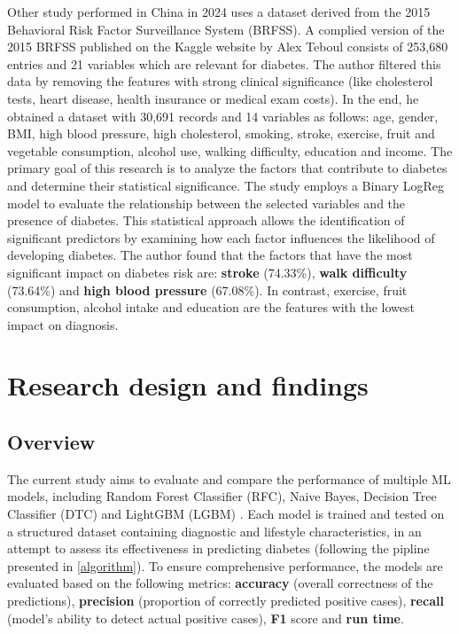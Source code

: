 \documentclass[runningheads]{llncs}
\begin{document}
Other study \cite{Xu2024} performed in China in 2024 uses a dataset derived from the 2015 Behavioral Risk Factor Surveillance System (BRFSS). A complied version of the 2015 BRFSS published on the Kaggle website by Alex Teboul consists of 253,680 entries and 21 variables which are relevant for diabetes. The author filtered this data by removing the features with strong clinical significance (like cholesterol tests, heart disease, health insurance or medical exam costs). In the end, he obtained a dataset with 30,691 records and 14 variables as follows: age, gender, BMI, high blood pressure, high cholesterol, smoking, stroke, exercise, fruit and vegetable consumption, alcohol use, walking difficulty, education and income. 
The primary goal of this research is to analyze the factors that contribute to diabetes and determine their statistical significance. 
The study employs a Binary LogReg model to evaluate the relationship between the selected variables and the presence of diabetes. This statistical approach allows the identification of significant predictors by examining how each factor influences the likelihood of developing diabetes. 
The author found that the factors that have the most significant impact on diabetes risk are: \textbf{stroke} (74.33\%), \textbf{walk difficulty} (73.64\%) and \textbf{high blood pressure} (67.08\%). In contrast, exercise, fruit consumption, alcohol intake and education are the features with the lowest impact on diagnosis.



\section{Research design and findings}
\label{section:proposedApproach}

\subsection{Overview}

The current study aims to evaluate and compare the performance of multiple ML models, including Random Forest Classifier (RFC), Naive Bayes, Decision Tree Classifier (DTC) and LightGBM (LGBM) \cite{aurelien2019hands}.  
Each model is trained and tested on a structured dataset containing diagnostic and lifestyle characteristics, in an attempt to assess its effectiveness in predicting diabetes (following the pipline presented in \autoref{algorithm}). 
To ensure comprehensive performance, the models are evaluated based on the following metrics: \textbf{accuracy} (overall correctness of the predictions), \textbf{ precision} (proportion of correctly predicted positive cases),  \textbf{recall} (model's ability to detect actual positive cases), \textbf{F1} score and   \textbf{run time}.
\end{document}
